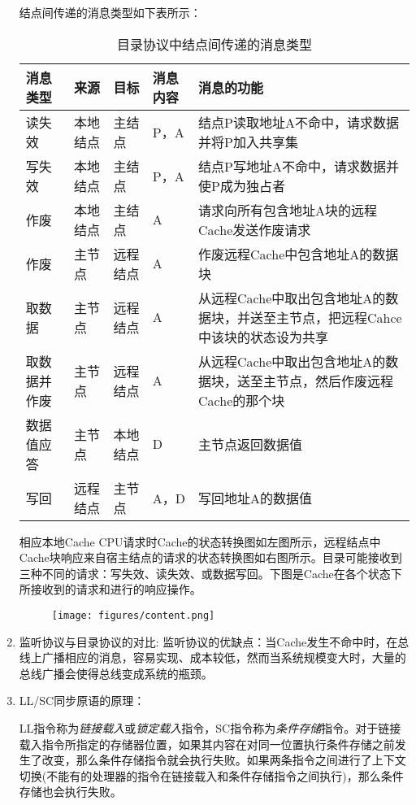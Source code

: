 \documentclass[a4paper]{ctexart}
\begin{document}
\begin{enumerate}
  结点间传递的消息类型如下表所示：
  \begin{table}[!hbp]
    \centering
    \caption{目录协议中结点间传递的消息类型}
    \begin{tabular}{llllp{6cm}} 
      \hline
      消息类型&来源&目标&消息内容&消息的功能 \\
      \hline
      读失效&本地结点&主结点&P，A&结点P读取地址A不命中，请求数据并将P加入共享集 \\
      \hline
      写失效&本地结点&主结点&P，A&结点P写地址A不命中，请求数据并使P成为独占者\\
      \hline
      作废&本地结点&主结点&A&请求向所有包含地址A块的远程Cache发送作废请求\\
      \hline
      作废&主节点&远程结点&A&作废远程Cache中包含地址A的数据块\\
      \hline
      取数据&主节点&远程结点&A&从远程Cache中取出包含地址A的数据块，并送至主节点，把远程Cahce中该块的状态设为共享\\
      \hline
      取数据并作废&主节点&远程结点&A&从远程Cache中取出包含地址A的数据块，送至主节点，然后作废远程Cache的那个块\\
      \hline
      数据值应答&主节点&本地结点&D&主节点返回数据值\\
      \hline
      写回&远程结点&主节点&A，D&写回地址A的数据值\\
      \hline
    \end{tabular}
  \end{table}
  
  相应本地Cache CPU请求时Cache的状态转换图如左图所示，远程结点中Cache块响应来自宿主结点的请求的状态转换图如右图所示。目录可能接收到三种不同的请求：写失效、读失效、或数据写回。下图是Cache在各个状态下所接收到的请求和进行的响应操作。
  
  \begin{figure}[htbp]
    \centering
    \texttt{[image: figures/content.png]}
  \end{figure}
  

  \item 监听协议与目录协议的对比:
  监听协议的优缺点：当Cache发生不命中时，在总线上广播相应的消息，容易实现、成本较低，然而当系统规模变大时，大量的总线广播会使得总线变成系统的瓶颈。
  
  \item LL/SC同步原语的原理：
  
  LL指令称为\emph{链接载入}或\emph{锁定载入}指令，SC指令称为\emph{条件存储}指令。对于链接载入指令所指定的存储器位置，如果其内容在对同一位置执行条件存储之前发生了改变，那么条件存储指令就会执行失败。如果两条指令之间进行了上下文切换(不能有的处理器的指令在链接载入和条件存储指令之间执行)，那么条件存储也会执行失败。
  

\end{enumerate}
\end{document}
